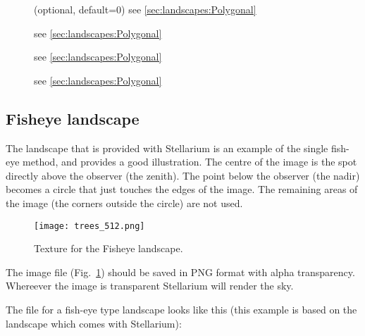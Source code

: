 \begin{description}
\item[] (optional, default=0) see \ref{sec:landscapes:Polygonal} %
\item[] see \ref{sec:landscapes:Polygonal}  %
\item[]  see \ref{sec:landscapes:Polygonal} %
\item[] see \ref{sec:landscapes:Polygonal}  %
\end{description}


\subsection{Fisheye landscape}
\label{sec:landscapes:Fisheye}

The  landscape that is provided with Stellarium is an
example of the single fish-eye method, and provides a good
illustration. The centre of the image is the spot directly above the
observer (the zenith). The point below the observer (the nadir)
becomes a circle that just touches the edges of the image. The
remaining areas of the image (the corners outside the circle) are not
used.

\begin{figure}[t]
\centering\texttt{[image: trees\_512.png]}
\caption{Texture for the  Fisheye landscape.}
\label{fig:landscapes:Fisheye}
\end{figure}


The image file (Fig.~\ref{fig:landscapes:Fisheye}) should be saved in
PNG format with alpha transparency. Whereever the image is transparent
Stellarium will render the sky.

The  file for a fish-eye type landscape looks like
this (this example is based on the  landscape which
comes with Stellarium):

